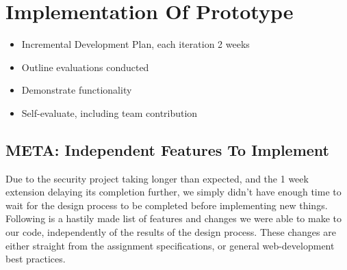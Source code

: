 \documentclass[12pt]{article}
\begin{document}
\section[Implementation]{Implementation Of Prototype}

\begin{itemize}
    \item Incremental Development Plan, each iteration 2 weeks
    \item Outline evaluations conducted
    \item Demonstrate functionality
    \item Self-evaluate, including team contribution
\end{itemize}

\subsection{META: Independent Features To Implement}

Due to the security project taking longer than expected, and the 1 week extension delaying its completion further, we simply didn't have enough time to wait for the design process to be completed before implementing new things. Following is a hastily made list of features and changes we were able to make to our code, independently of the results of the design process. These changes are either straight from the assignment specifications, or general web-development best practices.
\end{document}
